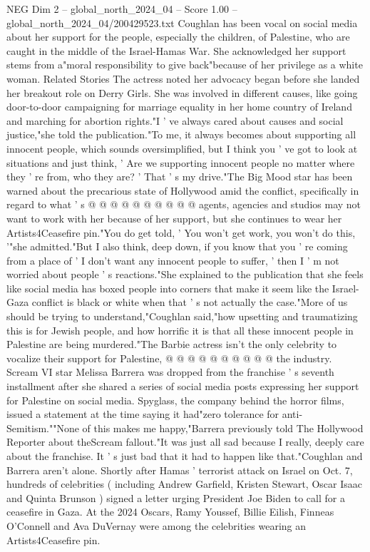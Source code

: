 \begin{textsample}{NEG Dim 2 – global\_north\_2024\_04 – Score 1.00 – global\_north\_2024\_04/200429523.txt}  \label{ex:f2_neg_186}
Coughlan has been vocal on social media about her support for the people, especially the children, of Palestine, who are caught in the middle of the Israel-Hamas War.
She acknowledged her support stems from a"moral responsibility to give back"because of her privilege as a white woman.
Related Stories The actress noted her advocacy began before she landed her breakout role on Derry Girls.
She was involved in different causes, like going door-to-door campaigning for marriage equality in her home country of Ireland and marching for abortion rights."I ' ve always cared about causes and social justice,"she told the publication."To me, it always becomes about supporting all innocent people, which sounds oversimplified, but I think you ' ve got to look at situations and just think, ' Are we supporting innocent people no matter where they ' re from, who they are? ' That ' s my drive."The Big Mood star has been warned about the precarious state of Hollywood amid the conflict, specifically in regard to what ' s @ @ @ @ @ @ @ @ @ @ agents, agencies and studios may not want to work with her because of her support, but she continues to wear her Artists4Ceasefire pin."You do get told, ' You won't get work, you won't do this, '"she admitted."But I also think, deep down, if you know that you ' re coming from a place of ' I don't want any innocent people to suffer, ' then I ' m not worried about people ' s reactions."She explained to the publication that she feels like social media has boxed people into corners that make it seem like the Israel-Gaza conflict is black or white when that ' s not actually the case."More of us should be trying to understand,"Coughlan said,"how upsetting and traumatizing this is for Jewish people, and how horrific it is that all these innocent people in Palestine are being murdered."The Barbie actress isn't the only celebrity to vocalize their support for Palestine, @ @ @ @ @ @ @ @ @ @ the industry.
Scream VI star Melissa Barrera was dropped from the franchise ' s seventh installment after she shared a series of social media posts expressing her support for Palestine on social media.
Spyglass, the company behind the horror films, issued a statement at the time saying it had"zero tolerance for anti-Semitism.""None of this makes me happy,"Barrera previously told The Hollywood Reporter about theScream fallout."It was just all sad because I really, deeply care about the franchise.
It ' s just bad that it had to happen like that."Coughlan and Barrera aren't alone.
Shortly after Hamas ' terrorist attack on Israel on Oct. 7, hundreds of celebrities ( including Andrew Garfield, Kristen Stewart, Oscar Isaac and Quinta Brunson ) signed a letter urging President Joe Biden to call for a ceasefire in Gaza.
At the 2024 Oscars, Ramy Youssef, Billie Eilish, Finneas O'Connell and Ava DuVernay were among the celebrities wearing an Artists4Ceasefire pin.

\end{textsample}
